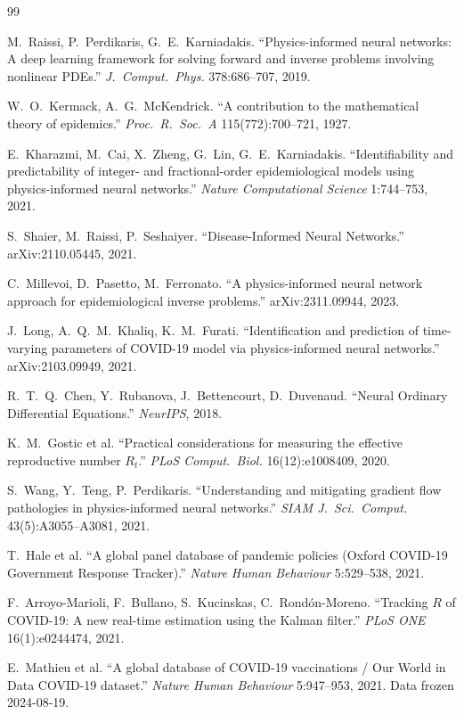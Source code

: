 \documentclass[10pt,twocolumn]{article}
\begin{document}
\begin{thebibliography}{99}
\small

 M.~Raissi, P.~Perdikaris, G.~E.~Karniadakis.
``Physics-informed neural networks: A deep learning framework for solving forward
and inverse problems involving nonlinear PDEs.''
\emph{J.\ Comput.\ Phys.} 378:686--707, 2019.

 W.~O.~Kermack, A.~G.~McKendrick.
``A contribution to the mathematical theory of epidemics.''
\emph{Proc.\ R.\ Soc.\ A} 115(772):700--721, 1927.

 E.~Kharazmi, M.~Cai, X.~Zheng, G.~Lin, G.~E.~Karniadakis.
``Identifiability and predictability of integer- and fractional-order
epidemiological models using physics-informed neural networks.''
\emph{Nature Computational Science} 1:744--753, 2021.

 S.~Shaier, M.~Raissi, P.~Seshaiyer.
``Disease-Informed Neural Networks.'' arXiv:2110.05445, 2021.

 C.~Millevoi, D.~Pasetto, M.~Ferronato.
``A physics-informed neural network approach for epidemiological inverse
problems.'' arXiv:2311.09944, 2023.

 J.~Long, A.~Q.~M.~Khaliq, K.~M.~Furati.
``Identification and prediction of time-varying parameters of COVID-19 model via
physics-informed neural networks.'' arXiv:2103.09949, 2021.

 R.~T.~Q.~Chen, Y.~Rubanova, J.~Bettencourt, D.~Duvenaud.
``Neural Ordinary Differential Equations.'' \emph{NeurIPS}, 2018.

 K.~M.~Gostic et al.
``Practical considerations for measuring the effective reproductive number $R_t$.''
\emph{PLoS Comput.\ Biol.} 16(12):e1008409, 2020.

 S.~Wang, Y.~Teng, P.~Perdikaris.
``Understanding and mitigating gradient flow pathologies in physics-informed
neural networks.'' \emph{SIAM J.\ Sci.\ Comput.} 43(5):A3055--A3081, 2021.

 T.~Hale et al.
``A global panel database of pandemic policies (Oxford COVID-19 Government
Response Tracker).'' \emph{Nature Human Behaviour} 5:529--538, 2021.

 F.~Arroyo-Marioli, F.~Bullano, S.~Kucinskas,
C.~Rond\'on-Moreno. ``Tracking $R$ of COVID-19: A new real-time estimation using
the Kalman filter.'' \emph{PLoS ONE} 16(1):e0244474, 2021.

 E.~Mathieu et al.
``A global database of COVID-19 vaccinations / Our World in Data COVID-19
dataset.'' \emph{Nature Human Behaviour} 5:947--953, 2021. Data frozen 2024-08-19.

\end{thebibliography}
\end{document}
